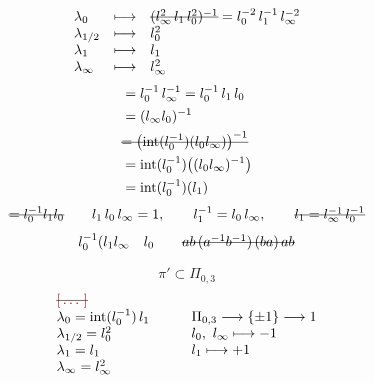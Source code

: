 \documentclass[11pt,a4paper]{article}
\begin{document}
\[
\begin{array}{lll}
\lambda_0 & \longmapsto & \text{\struck{$(l_\infty^{2}\, l_1\, l_0^{2})^{-1}$}} = l_0^{-2}\, l_1^{-1}\, l_\infty^{-2} \\
\lambda_{1/2} & \longmapsto & l_0^{2} \\
\lambda_1 & \longmapsto & l_1 \\
\lambda_\infty & \longmapsto & l_\infty^{2}
\end{array}
\]
\[
\begin{aligned}
&= l_0^{-1}\, l_\infty^{-1} = l_0^{-1}\, l_1\, l_0 \\
&= (l_\infty l_0)^{-1} \\
&\text{\struck{$= \bigl(\mathrm{int}(l_0^{-1})(l_0 l_\infty)\bigr)^{-1}$}} \\
&= \mathrm{int}(l_0^{-1})\bigl((l_0 l_\infty)^{-1}\bigr) \\
&= \mathrm{int}(l_0^{-1})(l_1)
\end{aligned}
\]
\[
\text{\struck{$= l_0^{-1} l_1 l_0$}} \qquad
l_1\, l_0\, l_\infty = 1, \qquad l_1^{-1} = l_0\, l_\infty, \qquad
\text{\struck{$l_1 = l_\infty^{-1}\, l_0^{-1}$}}
\]
\[
l_0^{-1}(l_1 l_\infty \quad l_0 \qquad
\text{\struck{$ab\,(a^{-1}b^{-1})\,(ba)\,ab$}}
\]

\[
\pi' \subset \Pi_{0,3}
\]
\[
\begin{array}{l}
\text{\struck{\ill{}}} \\
\lambda_0 = \mathrm{int}(l_0^{-1})\, l_1 \\
\lambda_{1/2} = l_0^{2} \\
\lambda_1 = l_1 \\
\lambda_\infty = l_\infty^{2}
\end{array}
\qquad
\begin{array}{l}
\Pi_{0,3} \longrightarrow \{\pm 1\} \longrightarrow 1 \\
l_0,\ l_\infty \longmapsto -1 \\
l_1 \longmapsto +1
\end{array}
\]

\end{document}
